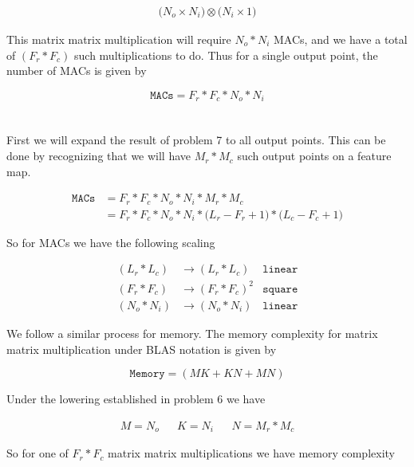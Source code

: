 \documentclass[12pt]{article}
\begin{document}
\begin{align}
	\bigg(N_o \times N_i\bigg) \otimes \bigg(N_i \times 1 \bigg)
\end{align}

This matrix matrix multiplication will require $N_o * N_i$ MACs, and we have a
total of $(F_r * F_c)$ such multiplications to do. Thus for a single output
point, the number of MACs is given by

\begin{equation}
	\texttt{MACs} = F_r * F_c * N_o * N_i
\end{equation}

\section{}

First we will expand the result of problem 7 to all output points. This can be
done by recognizing that we will have $M_r * M_c$ such output points on a
feature map.

\begin{align}
	\texttt{MACs} &= F_r * F_c * N_o * N_i * M_r * M_c \\
	&= F_r * F_c * N_o * N_i * \big(L_r - F_r + 1\big) * \big(L_c - F_c + 1\big)
\end{align}

So for MACs we have the following scaling

\begin{align}
	(L_r * L_c) &\rightarrow (L_r * L_c) &\texttt{linear}  \\
	(F_r * F_c) &\rightarrow (F_r * F_c)^2 &\texttt{square} \\
	(N_o * N_i) &\rightarrow (N_o * N_i) &\texttt{linear}
\end{align}

We follow a similar process for memory. The memory complexity for matrix matrix
multiplication under BLAS notation is given by

\begin{equation}
	\texttt{Memory} = (M K + K N + M N)
\end{equation}

Under the lowering established in problem 6 we have

\begin{align}
	M = N_o && K = N_i && N = M_r * M_c
\end{align}

So for one of $F_r * F_c$ matrix matrix multiplications we have memory
complexity
\end{document}
